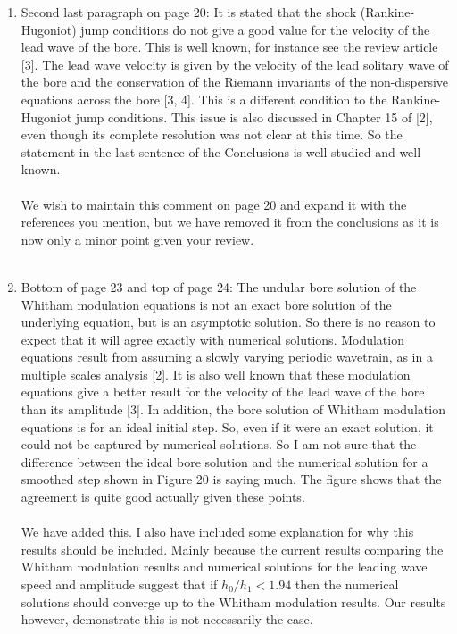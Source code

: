 \documentclass[times]{article}
\begin{document}
\begin{enumerate}
		
		\item Second last paragraph on page 20: It is stated that the shock (Rankine-Hugoniot) jump	conditions do not give a good value for the velocity of the lead wave of the bore. This	is well known, for instance see the review article [3]. The lead wave velocity is given by	the velocity of the lead solitary wave of the bore and the conservation of the Riemann invariants of the non-dispersive equations across the bore [3, 4]. This is a different condition to the Rankine-Hugoniot jump conditions. This issue is also discussed in	Chapter 15 of [2], even though its complete resolution was not clear at this time. So the statement in the last sentence of the Conclusions is well studied and well known. \\ \\
		 {\color{blue} We wish to maintain this comment on page 20 and expand it with the references you mention, but we have removed it from the conclusions as it is now only a minor point given your review.} \\ \\
		
		\item Bottom of page 23 and top of page 24: The undular bore solution of the Whitham	modulation equations is not an exact bore solution of the underlying equation, but is an asymptotic solution. So there is no reason to expect that it will agree exactly with numerical solutions. Modulation equations result from assuming a slowly varying periodic wavetrain, as in a multiple scales analysis [2]. It is also well known that these modulation equations give a better result for the velocity of the lead wave of the bore than its amplitude [3]. In addition, the bore solution of Whitham modulation equations	is for an ideal initial step. So, even if it were an exact solution, it could not be captured
		by numerical solutions. So I am not sure that the difference between the ideal bore solution and the numerical solution for a smoothed step shown in Figure 20 is saying much. The figure shows that the agreement is quite good actually given these points.
		 \\ \\
		 {\color{blue} We have added this. I also have included some explanation for why this results should be included. Mainly because the current results comparing the Whitham modulation results and numerical solutions for the leading wave speed and amplitude suggest that if $h_0 / h_1 < 1.94$ then the numerical solutions should converge up to the Whitham modulation results. Our results however, demonstrate this is not necessarily the case.} \\ \\
	\end{enumerate}
\end{document}
